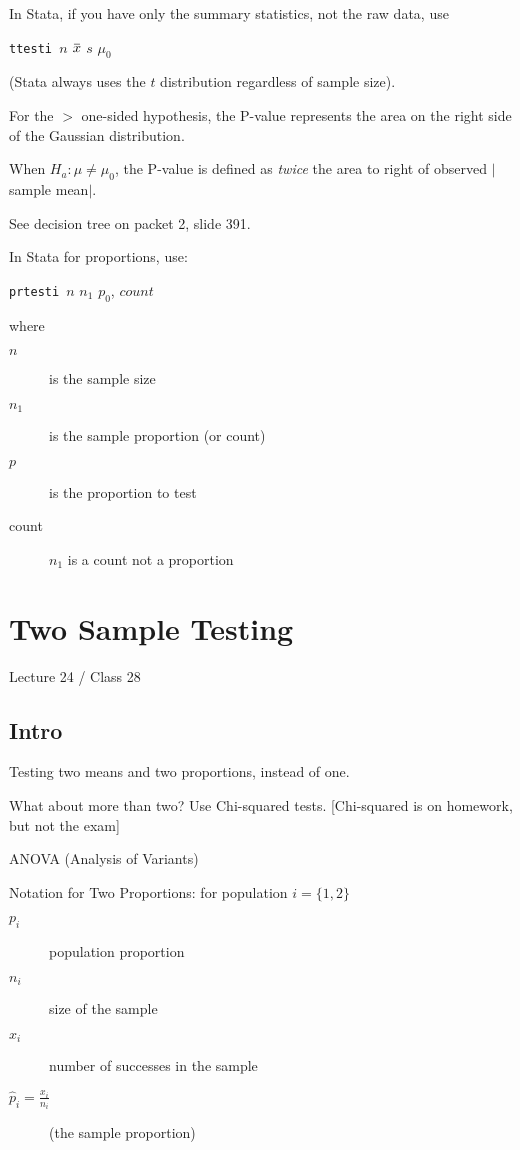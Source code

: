 \documentclass[11pt, oneside]{article}   	%
\newcommand{\overbar}[1]{\mkern 1.5mu\overline{\mkern-1.5mu#1\mkern-1.5mu}\mkern 1.5mu}
\begin{document}
In Stata, if you have only the summary statistics, not the raw data, use

 \texttt{ttesti }$n$ $\overbar{x}$ $s$ $\mu_0$
 
 (Stata always uses the $t$ distribution regardless of sample size).
 
 For the $>$ one-sided hypothesis, the P-value represents the area on the right side of the Gaussian distribution.
 
 When $H_a : \mu \neq \mu_0$, the P-value is defined as \textit{twice} the area to right of observed $|$sample mean$|$.
 
 See decision tree on packet 2, slide 391.
 
In Stata for proportions, use:

 \texttt{prtesti }$n$ $n_1$ $p_0$, $count$
 
 where
 \begin{description}
 \item [$n$]is the sample size
 \item[$n_1$] is the sample proportion (or count)
 \item[$p$] is the proportion to test
 \item[count]$n_1$ is a count not a proportion
 \end{description}

\section{Two Sample Testing}
Lecture 24 / Class 28

\subsection{Intro}

Testing two means and two proportions, instead of one. 

What about more than two? Use Chi-squared tests. [Chi-squared is on homework, but not the exam]

ANOVA (Analysis of Variants) 


Notation for Two Proportions: for population $i = \{1, 2\}$
 \begin{description}
 \item [$p_i$]population proportion
 \item[$n_i$]size of the sample
 \item[$x_i$]number of successes in the sample
 \item[$\hat{p}_i = \frac{x_i}{n_i}$](the sample proportion)
 \end{description}
\end{document}
